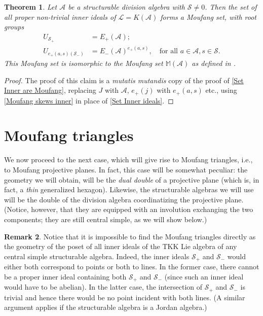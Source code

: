 \documentclass[oneside,a4paper]{amsart} %
\newtheorem{theorem}{Theorem}[section]
\theoremstyle{definition}
\newtheorem{remark}[theorem]{Remark}
\newcommand{\A}{\mathcal{A}}
\renewcommand{\SS}{\mathcal{S}}
\newcommand{\LL}{\mathcal{L}}
\numberwithin{equation}{section}
\begin{document}
\begin{theorem}
\label{non-ab Moufang}
	Let $\A$ be a structurable division algebra with $\mathcal S\neq 0$. Then the set of all proper non-trivial inner ideals of $\LL=K(\A)$ forms a Moufang set, with root groups 
	\begin{align*} 
		U_{\SS_+}&=E_+(\A);\\
		 U_{e_+(a,s)(\SS_-)}&=E_-(\A)^{e_+(a,s)}, \quad \text{for all } a\in\A, s\in\SS.
	\end{align*}
	This Moufang set is isomorphic to the Moufang set $\mathbb{M}(\A)$ as defined in \cite[Theorem~5.1.6]{Boelaert2019}.
\end{theorem}
\begin{proof}
	The proof of this claim is a \emph{mutatis mutandis} copy of the proof of \cref{Set Inner are Moufang}, replacing $J$ with $\mathcal A$, $e_+(j)$ with $e_+(a,s)$ etc., using \cref{Moufang skews inner} in place of \cref{Set Inner ideals}.
\end{proof}


\section{Moufang triangles}
\label{sec 6}

We now proceed to the next case, which will give rise to Moufang triangles, i.e., to Moufang projective planes.
In fact, this case will be somewhat peculiar: the geometry we will obtain, will be the \textit{dual double} of a projective plane (which is, in fact, a \textit{thin} generalized hexagon).
Likewise, the structurable algebras we will use will be the double of the division algebra coordinatizing the projective plane. (Notice, however, that they are equipped with an involution exchanging the two components; they are still central simple, as we will show below.)

\begin{remark}\label{rem:dualdouble}
    Notice that it is impossible to find the Moufang triangles directly as the geometry of the poset of all inner ideals of the TKK Lie algebra of any central simple structurable algebra.
    Indeed, the inner ideals $\SS_+$ and $\SS_-$ would either both correspond to points or both to lines.
    In the former case, there cannot be a proper inner ideal containing both $\SS_+$ and $\SS_-$ (since such an inner ideal would have to be abelian).
    In the latter case, the intersection of $\SS_+$ and $\SS_-$ is trivial and hence there would be no point incident with both lines.
    (A similar argument applies if the structurable algebra is a Jordan algebra.)
\end{remark}
\end{document}
